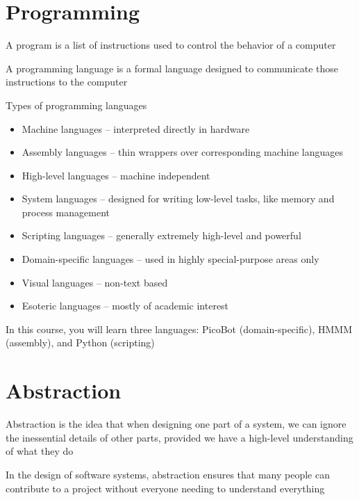 \documentclass[8pt,a4paper,compress]{beamer}
\begin{document}
\section{Programming}
\begin{frame}[fragile]
\pause

A program is a list of instructions used to control the behavior of a computer

\pause
\bigskip

A programming language is a formal language designed to communicate those instructions to the computer

\pause
\bigskip

Types of programming languages
\begin{itemize}
\item Machine languages -- interpreted directly in hardware
\item Assembly languages -- thin wrappers over corresponding machine languages
\item High-level languages -- machine independent
\item System languages -- designed for writing low-level tasks, like memory and process management
\item Scripting languages -- generally extremely high-level and powerful
\item Domain-specific languages -- used in highly special-purpose areas only
\item Visual languages -- non-text based
\item Esoteric languages -- mostly of academic interest
\end{itemize}

\pause
\bigskip

In this course, you will learn three languages: PicoBot (domain-specific), HMMM (assembly), and Python (scripting)
\end{frame}

\section{Abstraction}
\begin{frame}[fragile]
\pause

Abstraction is the idea that when designing one part of a system, we can ignore the inessential details of other parts, provided we have a high-level understanding of what they do

\pause
\bigskip

In the design of software systems, abstraction ensures that many people can contribute to a project without everyone needing to understand everything
\end{frame}
\end{document}
